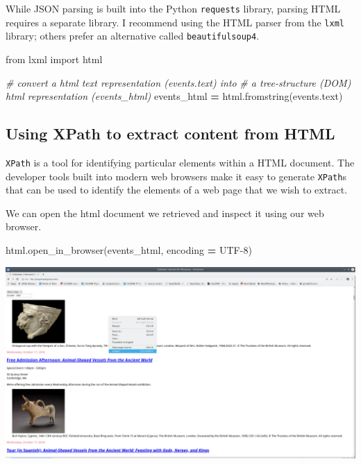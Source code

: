 \documentclass[
]{book}
\newenvironment{Shaded}{\begin{snugshade}}{\end{snugshade}}
\newcommand{\CommentTok}[1]{\textcolor[rgb]{0.56,0.35,0.01}{\textit{#1}}}
\newcommand{\ImportTok}[1]{#1}
\newcommand{\NormalTok}[1]{#1}
\newcommand{\OperatorTok}[1]{\textcolor[rgb]{0.81,0.36,0.00}{\textbf{#1}}}
\newcommand{\StringTok}[1]{\textcolor[rgb]{0.31,0.60,0.02}{#1}}
\begin{document}
While JSON parsing is built into the Python \texttt{requests} library, parsing HTML requires a separate library. I recommend using the HTML parser from the \texttt{lxml} library; others prefer an alternative called \texttt{beautifulsoup4}.

\begin{Shaded}
\begin{Highlighting}[]
\ImportTok{from}\NormalTok{ lxml }\ImportTok{import}\NormalTok{ html}

\CommentTok{\# convert a html text representation (\textasciigrave{}events.text\textasciigrave{}) into }
\CommentTok{\# a tree{-}structure (DOM) html representation (\textasciigrave{}events\_html\textasciigrave{})}
\NormalTok{events\_html }\OperatorTok{=}\NormalTok{ html.fromstring(events.text)}
\end{Highlighting}
\end{Shaded}

\hypertarget{using-xpath-to-extract-content-from-html}{%
\subsection{Using XPath to extract content from HTML}\label{using-xpath-to-extract-content-from-html}}

\texttt{XPath} is a tool for identifying particular elements within a HTML document. The developer tools built into modern web browsers make it easy to generate \texttt{XPath}s that can be used to identify the elements of a web page that we wish to extract.

We can open the html document we retrieved and inspect it using our web browser.

\begin{Shaded}
\begin{Highlighting}[]
\NormalTok{html.open\_in\_browser(events\_html, encoding }\OperatorTok{=} \StringTok{\textquotesingle{}UTF{-}8\textquotesingle{}}\NormalTok{)}
\end{Highlighting}
\end{Shaded}

\includegraphics{Python/PythonWebScrape/images/dev_tools_right_click.png}
\end{document}
